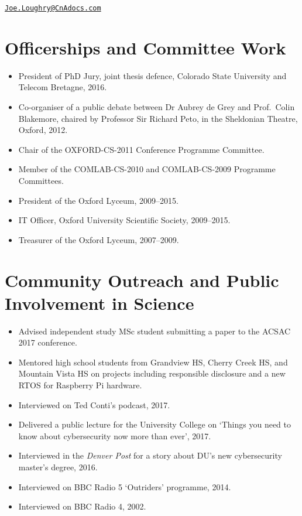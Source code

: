 \documentclass[12pt,twoside,letterpaper]{article}
\begin{document}
\vspace*{-23mm}\hfill\href{mailto:Joe.Loughry@CnAdocs.com}%
{\nolinkurl{Joe.Loughry@CnAdocs.com}}

\vspace*{-7mm}
\section*{Officerships and Committee Work}
\vspace{-2mm}

\begin{itemize}
    \item President of PhD Jury, joint thesis defence, Colorado
        State University and Telecom Bretagne, 2016.
	\item Co-organiser of a public debate between Dr Aubrey de Grey
		and Prof.\ Colin Blakemore, chaired by Professor Sir Richard
		Peto, in the Sheldonian Theatre, Oxford, 2012.
	\item Chair of the OXFORD-CS-2011 Conference Programme Committee.
	\item Member of the COMLAB-CS-2010 and COMLAB-CS-2009 Programme
		Committees.
	\item President of the Oxford Lyceum, 2009--2015.
	\item IT Officer, Oxford University Scientific Society, 2009--2015.
	\item Treasurer of the Oxford Lyceum, 2007--2009.
\end{itemize}

\vspace{-7mm}
\section*{Community Outreach and Public Involvement in Science}
\vspace{-2mm}

\begin{itemize}
    \item Advised independent study MSc student submitting a paper to the
        ACSAC 2017 conference.
    \item Mentored high school students from Grandview HS, Cherry Creek HS,
        and Mountain Vista HS on projects including responsible disclosure
        and a new RTOS for Raspberry Pi hardware.
    \item Interviewed on Ted Conti's podcast, 2017.
    \item Delivered a public lecture for the University College on `Things
        you need to know about cybersecurity now more than ever', 2017.
    \item Interviewed in the \emph{Denver Post} for a story about DU's new
        cybersecurity master's degree, 2016.
    \item Interviewed on BBC Radio 5 `Outriders' programme, 2014.
    \item Interviewed on BBC Radio 4, 2002.
\end{itemize}
\end{document}
